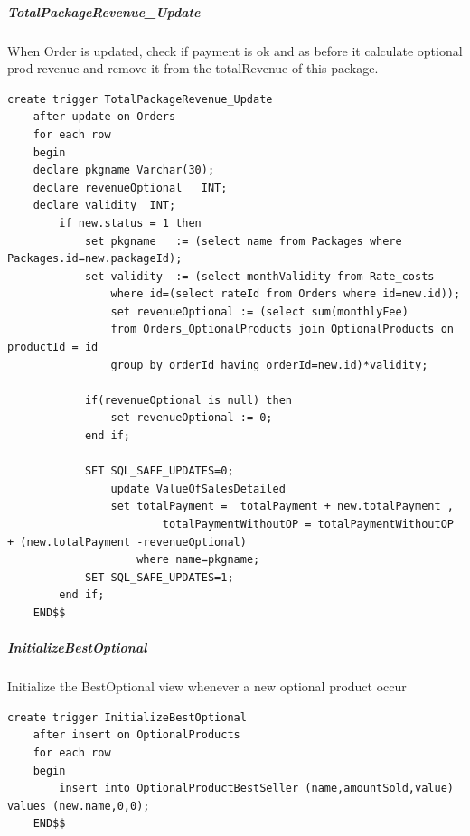\documentclass{article}
\begin{document}
\subparagraph{TotalPackageRevenue_Update}
When Order is updated, check if payment is ok and as before it calculate optional prod revenue and remove it from the totalRevenue of this package.
\begin{lstlisting}
create trigger TotalPackageRevenue_Update
	after update on Orders
	for each row
    begin
    declare pkgname Varchar(30);
	declare revenueOptional   INT;
    declare validity  INT;
		if new.status = 1 then
			set pkgname   := (select name from Packages where Packages.id=new.packageId);
			set validity  := (select monthValidity from Rate_costs 
				where id=(select rateId from Orders where id=new.id));
				set revenueOptional := (select sum(monthlyFee) 
				from Orders_OptionalProducts join OptionalProducts on productId = id 
				group by orderId having orderId=new.id)*validity;
        
			if(revenueOptional is null) then
				set revenueOptional := 0;
			end if;
        
			SET SQL_SAFE_UPDATES=0;
				update ValueOfSalesDetailed 
				set totalPayment =  totalPayment + new.totalPayment ,
                		totalPaymentWithoutOP = totalPaymentWithoutOP + (new.totalPayment -revenueOptional)
					where name=pkgname;
			SET SQL_SAFE_UPDATES=1;                     
        end if;
    END$$
\end{lstlisting}

\subparagraph{InitializeBestOptional}
Initialize the BestOptional view whenever a new optional product occur
\begin{lstlisting}
create trigger InitializeBestOptional
	after insert on OptionalProducts
    for each row
    begin
		insert into OptionalProductBestSeller (name,amountSold,value) values (new.name,0,0);
    END$$
\end{lstlisting}
\end{document}
